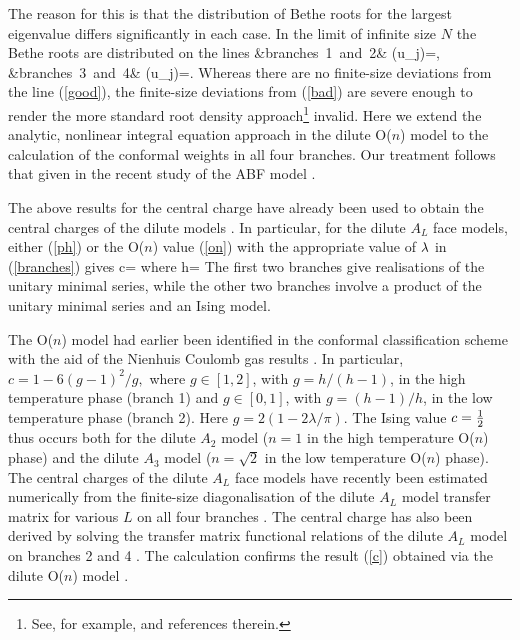 The reason for this is that the distribution of Bethe roots for the largest
eigenvalue differs significantly
in each case. In the limit of infinite size $N$        
the Bethe roots are distributed on the lines \cite{BNW:89,WBN:92,Warnaar}
\be
&\mbox{branches 1 and 2}& \quad \im (u_j)=\half\pi, \label{good} \\
&\mbox{branches 3 and 4}& \quad \im (u_j)=\pm\half\pi \lam. \label{bad}
\ee
Whereas there are no finite-size deviations from the line (\ref{good}),
the finite-size deviations from (\ref{bad}) are severe
enough to render the more standard root density approach\footnote{See, for
example, \cite{SNW:92} and references therein.} invalid.  
%
Here we extend the analytic, nonlinear integral equation 
approach in the dilute O($n$) model 
\cite{WBN:92,Warnaar} to the calculation of the 
conformal weights in all four branches. Our treatment follows that given 
in the recent study of the ABF model \cite{Zhou:95}. 

The above results for the central charge have
already been used to obtain the central charges of the dilute \ade 
models \cite{WNS:92,WNS:93,Warnaar}.    
In particular, for the dilute $A_L$ face models, either (\ref{ph}) or 
the O($n$) value (\ref{on}) with
the appropriate value of $\lambda$ in (\ref{branches}) gives
\be
c=\label{c}
\ee
where
\beq
h=
\eeq
The first two branches give realisations of the unitary 
minimal series, while the other two branches involve a product of the 
unitary minimal series and an Ising model. 

The O($n$) model had earlier
been identified \cite{DF:84,SS:85} in the conformal classification 
scheme \cite{BPZ:84,FQS:84} 
with the aid of the Nienhuis Coulomb gas results \cite{N:82,N:84}. 
In particular, 
$
c = 1 - 6(g-1)^2/g,
$
where $g \in [1,2]$, with $g=h/(h-1)$, in the high temperature phase 
(branch 1) and $g \in [0,1]$, with $g=(h-1)/h$, in the low temperature 
phase (branch 2). Here $g = 2 (1-2 \lambda/\pi)$. 
The Ising value $c=\mbox{$\textstyle {1 \over 2}$}$ thus occurs both for the 
dilute $A_2$ model ($n=1$ in the high temperature O($n$) 
phase) and the dilute $A_3$ model ($n=\sqrt 2$ in the low temperature O($n$) 
phase). The central charges of the dilute $A_L$ face models have recently 
been estimated numerically from the 
finite-size diagonalisation of the dilute $A_L$ model transfer matrix for 
various $L$  on all four branches \cite{OP:95}. 
The central charge has also been derived by solving the
transfer matrix functional relations of the dilute $A_L$ model on branches  
2 and 4 \cite{ZP:95p}. 
The calculation confirms the result (\ref{c}) obtained 
via the dilute O($n$) model \cite{WNS:92,WNS:93,Warnaar}.  


